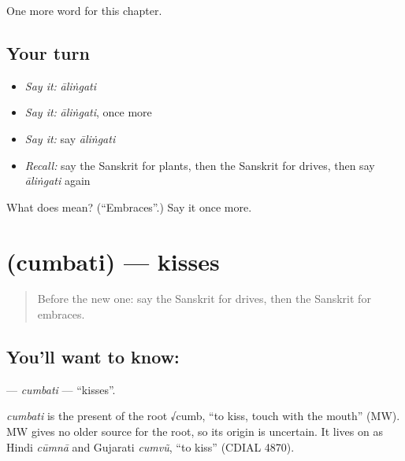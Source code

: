 \begin{grammarlens}[title={What you've built}]
One more word for this chapter.
\end{grammarlens}

\subsection*{Your turn}
\begin{itemize}
\raggedright
  \item \emph{Say it:} \emph{āliṅgati}
  \item \emph{Say it:} \emph{āliṅgati}, once more
  \item \emph{Say it:} say \emph{āliṅgati}
  \item \emph{Recall:} say the Sanskrit for plants, then the Sanskrit for drives, then say \emph{āliṅgati} again
\end{itemize}

\begin{tcolorbox}[breakable,colback=teal!4,colframe=teal!35!black,title={Before you move on}]
What does  mean? (\textquotedblleft{}Embraces\textquotedblright{}.) Say it once more.
\end{tcolorbox}
\section[\texorpdfstring{\sk{चुम्बति} (cumbati)}{चुम्बति (cumbati)}]{ (cumbati) — kisses}

\label{lesson:SA-C235-cumbati}



\begin{quote}
Before the new one: say the Sanskrit for drives, then the Sanskrit for embraces.
\end{quote}

\subsection*{You'll want to know: }
\textbf{} — \emph{cumbati} — \textquotedblleft{}kisses\textquotedblright{}.

\begin{cousinweb}
\emph{cumbati} is the present of the root √cumb, \textquotedblleft{}to kiss, touch with the mouth\textquotedblright{} (MW). MW gives no older source for the root, so its origin is uncertain. It lives on as Hindi \emph{cūmnā} and Gujarati \emph{cumvũ}, \textquotedblleft{}to kiss\textquotedblright{} (CDIAL 4870).
\end{cousinweb}

